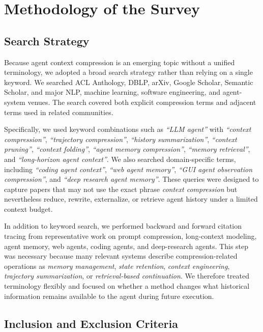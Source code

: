\newpage

\section{Methodology of the Survey}
\label{app:methodology}

\subsection{Search Strategy}
\label{app:search-strategy}

Because agent context compression is an emerging topic without a unified terminology, we adopted a broad search strategy rather than relying on a single keyword. We searched ACL Anthology, DBLP, arXiv, Google Scholar, Semantic Scholar, and major NLP, machine learning, software engineering, and agent-system venues. The search covered both explicit compression terms and adjacent terms used in related communities.

Specifically, we used keyword combinations such as \textit{``LLM agent''} with \textit{``context compression''}, \textit{``trajectory compression''}, \textit{``history summarization''}, \textit{``context pruning''}, \textit{``context folding''}, \textit{``agent memory compression''}, \textit{``memory retrieval''}, and \textit{``long-horizon agent context''}. We also searched domain-specific terms, including \textit{``coding agent context''}, \textit{``web agent memory''}, \textit{``GUI agent observation compression''}, and \textit{``deep research agent memory''}. These queries were designed to capture papers that may not use the exact phrase \textit{context compression} but nevertheless reduce, rewrite, externalize, or retrieve agent history under a limited context budget.

In addition to keyword search, we performed backward and forward citation tracing from representative work on prompt compression, long-context modeling, agent memory, web agents, coding agents, and deep-research agents. This step was necessary because many relevant systems describe compression-related operations as \textit{memory management}, \textit{state retention}, \textit{context engineering}, \textit{trajectory summarization}, or \textit{retrieval-based continuation}. We therefore treated terminology flexibly and focused on whether a method changes what historical information remains available to the agent during future execution.

\subsection{Inclusion and Exclusion Criteria}
\label{app:inclusion-exclusion}

